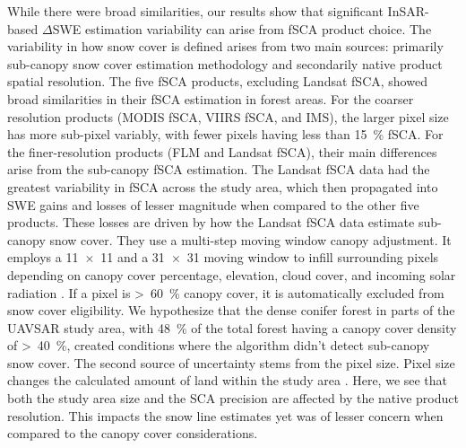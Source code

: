 While there were broad similarities, our results show that significant InSAR-based $\Delta$SWE estimation variability can arise from fSCA product choice. The variability in how snow cover is defined arises from two main sources: primarily sub-canopy snow cover estimation methodology and secondarily native product spatial resolution. The five fSCA products, excluding Landsat fSCA, showed broad similarities in their fSCA estimation in forest areas. For the coarser resolution products (MODIS fSCA, VIIRS fSCA, and IMS), the larger pixel size has more sub-pixel variably, with fewer pixels having less than 15~\% fSCA. For the finer-resolution products (FLM and Landsat fSCA), their main differences arise from the sub-canopy fSCA estimation. The Landsat fSCA data had the greatest variability in fSCA across the study area, which then propagated into SWE gains and losses of lesser magnitude when compared to the other five products. These losses are driven by how the Landsat fSCA data estimate sub-canopy snow cover. They use a multi-step moving window canopy adjustment. It employs a 11~$\times$~11 and a 31~$\times$~31 moving window to infill surrounding pixels depending on canopy cover percentage, elevation, cloud cover, and incoming solar radiation \citep{selkowitzUSGSLandsatSnow2017}. If a pixel is >~60~\% canopy cover, it is automatically excluded from snow cover eligibility. We hypothesize that the dense conifer forest in parts of the UAVSAR study area, with 48~\% of the total forest having a canopy cover density of >~40~\%, created conditions where the algorithm didn't detect sub-canopy snow cover. The second source of uncertainty stems from the pixel size. Pixel size changes the calculated amount of land within the study area \cite{bairHowTradeoffsSatellite2023}. Here, we see that both the study area size and the SCA precision are affected by the native product resolution. This impacts the snow line estimates yet was of lesser concern when compared to the canopy cover considerations.

